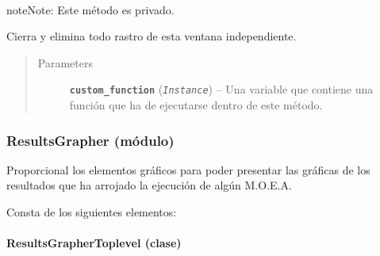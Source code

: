 \documentclass[letterpaper,10pt,english]{sphinxmanual}
\begin{document}
\begin{fulllineitems}
\begin{fulllineitems}
\end{fulllineitems}


\begin{fulllineitems}
\label{View/Additional/MenuInternalOption/AboutToplevel:View.Additional.MenuInternalOption.AboutToplevel.AboutToplevel._AboutToplevel__close}~
\begin{notice}{note}{Note:}
Este método es privado.
\end{notice}

Cierra y elimina todo rastro de esta ventana independiente.
\begin{quote}\begin{description}
\item[{Parameters}] \leavevmode
\textbf{\texttt{custom\_function}} (\emph{\texttt{Instance}}) -- Una variable que contiene una función que ha de 
ejecutarse dentro de este método.

\end{description}\end{quote}

\end{fulllineitems}


\end{fulllineitems}



\subsubsection{ResultsGrapher (módulo)}
\label{View/Additional/ResultsGrapher/ResultsGrapher:resultsgrapher-modulo}\label{View/Additional/ResultsGrapher/ResultsGrapher::doc}
Proporcional los elementos gráficos para poder presentar
las gráficas de los resultados que ha arrojado la ejecución
de algún M.O.E.A.

Consta de los siguientes elementos:


\paragraph{ResultsGrapherToplevel (clase)}
\label{View/Additional/ResultsGrapher/ResultsGrapherToplevel:module-View.Additional.ResultsGrapher.ResultsGrapherToplevel}\label{View/Additional/ResultsGrapher/ResultsGrapherToplevel:resultsgraphertoplevel-clase}\label{View/Additional/ResultsGrapher/ResultsGrapherToplevel::doc}
\end{document}
